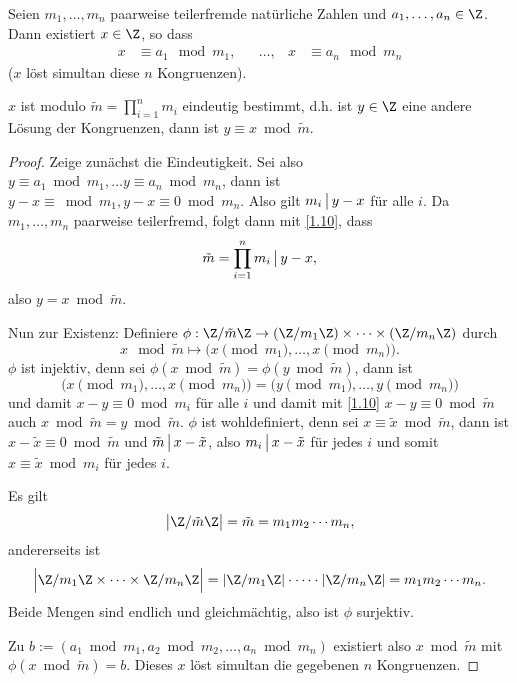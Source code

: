 \begin{st} \label{1.13}
	Seien $m_1, \dotsc, m_n$ paarweise teilerfremde natürliche Zahlen und $a_1, \dotsc, a_n \in \Z$.
	Dann existiert $x \in \Z$, so dass
	\begin{align*}
		x &\equiv a_1 \mod m_1,&
		&\dotsc,&
		x &\equiv a_n \mod m_n
	\end{align*}
	($x$ löst simultan diese $n$ Kongruenzen).

	$x$ ist modulo $\tilde m = \prod_{i=1}^n m_i$ eindeutig bestimmt, d.h. ist $y \in \Z$ eine andere Lösung der Kongruenzen, dann ist $y \equiv x \bmod \tilde m$.
	\begin{proof}
		Zeige zunächst die Eindeutigkeit.
		Sei also $y \equiv a_1 \bmod m_1, \dotsc y \equiv a_n \bmod m_n$, dann ist $y -x \equiv \bmod m_1, y-x \equiv 0 \bmod m_n$.
		Also gilt $m_i \divs y-x$ für alle $i$.
		Da $m_1, \dotsc, m_n$ paarweise teilerfremd, folgt dann mit \ref{1.10}, dass
		\[
			\tilde m = \prod_{i=1}^n m_i \divs y - x,
		\]
		also $y = x \bmod \tilde m$.

		Nun zur Existenz:
		Definiere $\phi: \Z / \tilde m \Z \to (\Z / m_1 \Z) \times \dotsb \times (\Z / m_n \Z)$ durch
		\[
			x \mod \tilde m
			\mapsto
			\big( x \pmod m_1, \dotsc, x \pmod m_n \big).
		\]
		$\phi$ ist injektiv, denn sei $\phi(x \bmod \tilde m) = \phi(y \bmod \tilde m)$, dann ist
		\[
			\big( x \pmod m_1, \dotsc, x \pmod m_n \big)
			= \big( y \pmod m_1, \dotsc, y \pmod m_n \big)
		\]
		und damit $x - y \equiv 0 \bmod m_i$ für alle $i$ und damit mit \ref{1.10} $x - y \equiv 0 \bmod \tilde m$ auch $x \bmod \tilde m = y \bmod \tilde m$.
		$\phi$ ist wohldefiniert, denn sei $x \equiv \tilde x \bmod \tilde m$, dann ist $x - \tilde x \equiv 0 \bmod \tilde m$ und $\tilde m \divs x - \tilde x$, also $m_i \divs x - \tilde x$ für jedes $i$ und somit $x \equiv \tilde x \bmod m_i$ für jedes $i$.

		Es gilt
		\[
			\big| \Z / \tilde m \Z \big|
			= \tilde m
			= m_1 m_2 \dotsb m_n,
		\]
		andererseits ist
		\[
			\Big| \Z/ m_1 \Z \times \dotsb \times \Z / m_n \Z \Big|
			= | \Z / m_1 \Z | \cdot \dotsb \cdot | \Z / m_n \Z|
			= m_1 m_2 \dotsb m_n.
		\]
		Beide Mengen sind endlich und gleichmächtig, also ist $\phi$ surjektiv.

		Zu $b := (a_1 \bmod m_1, a_2 \bmod m_2, \dotsc, a_n \bmod m_n)$ existiert also $x \bmod \tilde m$ mit $\phi(x \bmod \tilde m) = b$.
		Dieses $x$ löst simultan die gegebenen $n$ Kongruenzen.
	\end{proof}
\end{st}

